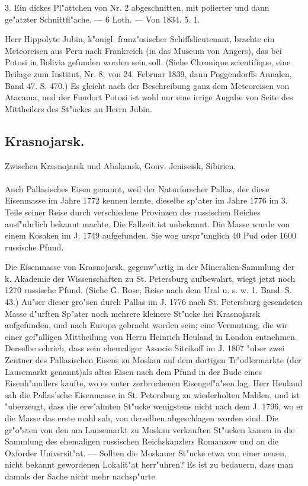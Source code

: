 \documentclass[a4paper, 11pt, oneside, polutonikogreek, german]{article}
\begin{document}
3. Ein dickes Pl"attchen von Nr. 2 abgeschnitten, mit polierter und dann ge"atzter Schnittfl"ache. --- 6 Loth. --- Von 1834. 5. 1.

Herr Hippolyte Jubin, k"onigl. franz"osischer Schiffslieutenant, brachte ein Meteoreisen aus Peru nach Frankreich (in das Museum von Angers), das bei Potosi in Bolivia gefunden worden sein soll. (Siehe Chronique scientifique, eine Beilage zum Institut, Nr. 8, von 24. Februar 1839, dann Poggendorffs Annalen, Band 47. S. 470.) Es gleicht nach der Beschreibung ganz dem Meteoreisen von Atacama, und der Fundort Potosi ist wohl nur eine irrige Angabe von Seite des Mittheilers des St"uckes an Herrn Jubin.
\subsection{Krasnojarsk.}
\begin{center}
\small
Zwischen Krasnojarsk und Abakansk, Gouv. Jeniseisk, Sibirien.
\end{center}
\paragraph{}
Auch Pallasisches Eisen genannt, weil der Naturforscher Pallas, der diese Eisenmasse im Jahre 1772 kennen lernte, dieselbe sp"ater im Jahre 1776 im 3. Teile seiner Reise durch verschiedene Provinzen des russischen Reiches ausf"uhrlich bekannt machte. Die Fallzeit ist unbekannt. Die Masse wurde von einem Kosaken im J. 1749 aufgefunden. Sie wog urspr"unglich 40 Pud oder 1600 russische Pfund.

Die Eisenmasse von Krasnojarsk, gegenw"artig in der Mineralien-Sammlung der k. Akademie der Wissenschaften zu St. Petersburg aufbewahrt, wiegt jetzt noch 1270 russische Pfund. (Siehe G. Rose, Reise nach dem Ural u. s. w. 1. Band. S. 43.) Au"ser dieser gro"sen durch Pallas im J. 1776 nach St. Petersburg gesendeten Masse d"urften Sp"ater noch mehrere kleinere St"ucke hei Krasnojarsk aufgefunden, und nach Europa gebracht worden sein; eine Vermutung, die wir einer gef"alligen Mittheilung von Herrn Heinrich Heuland in London entnehmen. Derselbe schrieb, dass sein ehemaliger Associe Sitrikoff im J. 1807 "uber zwei Zentner des Pallasischen Eisens zu Moskau auf dem dortigen Tr"odlermarkte (der Lausemarkt genannt)als altes Eisen nach dem Pfund in der Bude eines Eisenh"andlers kaufte, wo es unter zerbrochenen Eisengef"a"sen lag. Herr Heuland sah die Pallas'sche Eisenmasse in St. Petersburg zu wiederholten Mahlen, und ist "uberzeugt, dass die erw"ahnten St"ucke wenigstens nicht nach dem J. 1796, wo er die Masse das erste mahl sah, von derselben abgeschlagen worden sind. Die gr"o"sten von den am Lausemarkt zu Moskau verkauften St"ucken kamen in die Sammlung des ehemaligen russischen Reichskanzlers Romanzow und an die Oxforder Universit"at. --- Sollten die Moskauer St"ucke etwa von einer neuen, nicht bekannt gewordenen Lokalit"at herr"uhren? Es ist zu bedauern, dass man damals der Sache nicht mehr nachsp"urte.
\end{document}
